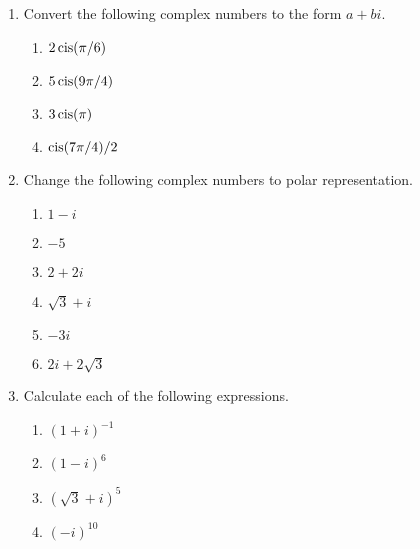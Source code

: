 {\begin{enumerate}
 
 \item   %
Convert the following complex numbers to the form $a + bi$.
\begin{multicols}{2}
\begin{enumerate}

 \item
$2 \operatorname{cis}(\pi / 6 )$

 
 \item
$5 \operatorname{cis}(9\pi/4)$

\item
$3 \operatorname{cis}(\pi)$
 
 \item
$\operatorname{cis}(7\pi/4) /2$
 
\end{enumerate}
\end{multicols}


\item	  %
Change the following complex numbers to polar representation.
\begin{multicols}{3}
\begin{enumerate}
 
 \item
$1-i$

 \item
$-5$
 
 \item
$2+2i$
 
 
\item
$\sqrt{3} + i$

 \item
$-3i$

 \item
$2i + 2 \sqrt{3}$
 
\end{enumerate}
\end{multicols}

 
 
\item %
Calculate each of the following expressions.
\begin{multicols}{2}
\begin{enumerate}
 
 \item
$(1+i)^{-1}$

 \item
$(1 - i)^{6}$
 
 \item
$(\sqrt{3}+i)^{5}$

 \item
$(-i)^{10}$
 

\end{enumerate}
\end{multicols}
\end{enumerate}}
